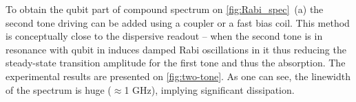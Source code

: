 \documentclass[a0, portrait]{a0poster}
\begin{document}
\begin{multicols}{2}
\begin{tcolorbox}[left=1cm, right=1cm, top=0.5cm, bottom=0.5cm, 
                  title={\Large Two-tone spectroscopy}, bottomtitle=.3cm,toptitle=.5cm
                  ]
\begingroup
\setlength{\columnsep}{1cm}	
\begin{multicols}{2}
To obtain the qubit part of compound spectrum on \autoref{fig:Rabi_spec}~(a) the second tone driving can be added using a coupler or a fast bias coil. This method is conceptually close to the dispersive readout -- when the second tone is in resonance with qubit in induces damped Rabi oscillations in it thus reducing the steady-state transition amplitude for the first tone and thus the absorption. The experimental results are presented on \autoref{fig:two-tone}. As one can see, the linewidth of the spectrum is huge ($\approx$1 GHz), implying significant dissipation. 
\end{multicols}
\endgroup


\end{tcolorbox}
\end{multicols}
\end{document}

